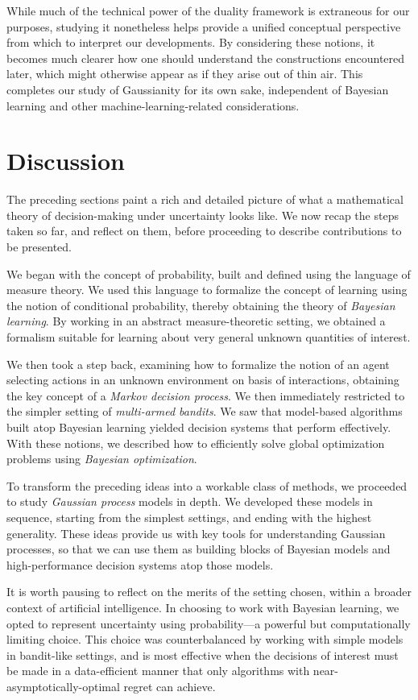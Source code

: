 \documentclass[11pt]{book}
\begin{document}
While much of the technical power of the duality framework is extraneous for our purposes, studying it nonetheless helps provide a unified conceptual perspective from which to interpret our developments.
By considering these notions, it becomes much clearer how one should understand the constructions encountered later, which might otherwise appear as if they arise out of thin air.
This completes our study of Gaussianity for its own sake, independent of Bayesian learning and other machine-learning-related considerations.

\section{Discussion}

The preceding sections paint a rich and detailed picture of what a mathematical theory of decision-making under uncertainty looks like.
We now recap the steps taken so far, and reflect on them, before proceeding to describe contributions to be presented.

We began with the concept of probability, built and defined using the language of measure theory. 
We used this language to formalize the concept of learning using the notion of conditional probability, thereby obtaining the theory of \emph{Bayesian learning}.
By working in an abstract measure-theoretic setting, we obtained a formalism suitable for learning about very general unknown quantities of interest.

We then took a step back, examining how to formalize the notion of an agent selecting actions in an unknown environment on basis of interactions, obtaining the key concept of a \emph{Markov decision process}.
We then immediately restricted to the simpler setting of \emph{multi-armed bandits}.
We saw that model-based algorithms built atop Bayesian learning yielded decision systems that perform effectively.
With these notions, we described how to efficiently solve global optimization problems using \emph{Bayesian optimization}.

To transform the preceding ideas into a workable class of methods, we proceeded to study \emph{Gaussian process} models in depth.
We developed these models in sequence, starting from the simplest settings, and ending with the highest generality.
These ideas provide us with key tools for understanding Gaussian processes, so that we can use them as building blocks of Bayesian models and high-performance decision systems atop those models.

It is worth pausing to reflect on the merits of the setting chosen, within a broader context of artificial intelligence.
In choosing to work with Bayesian learning, we opted to represent uncertainty using probability---a powerful but computationally limiting choice.
This choice was counterbalanced by working with simple models in bandit-like settings, and is most effective when the decisions of interest must be made in a data-efficient manner that only algorithms with near-asymptotically-optimal regret can achieve.
\end{document}
